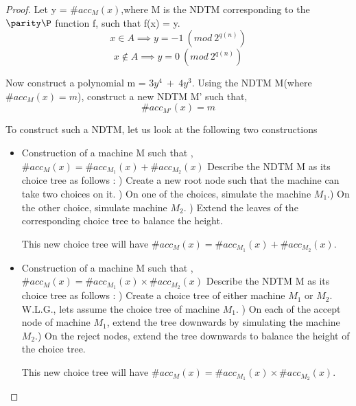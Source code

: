 \documentclass[11pt]{article}
\begin{document}
\begin{proof}
 Let y = $\#acc_{M}(x)$,where M is the NDTM corresponding to the $\parity \P$ function f, such that f(x) = y. \newline
 $$x \in A \implies y = -1~(mod~2^{q(n)})$$ 
$$x \notin A \implies y = 0~(mod~2^{q(n)})$$
 
 Now construct a polynomial m = $3y^{4}~+~4y^{3}$. Using the NDTM M(where $\#acc_{M}(x) = m$), construct a new NDTM M' such that,
 $$\#acc_{M'}(x) = m$$
 
  To construct such a NDTM, let us look at the following two constructions
  \begin{itemize}
   \item 
    Construction of a machine M such that , $\#acc_{M}(x) = \#acc_{M_{1}}(x) + \#acc_{M_{2}}(x)$ \newline
    Describe the NDTM M as its choice tree as follows : ) Create a new root node such that the machine can take two choices on it. ) On one of the choices, simulate the machine $M_{1}$.) On the other choice, simulate machine $M_{2}$. ) Extend the leaves of the corresponding choice tree to balance the height. \newline
    
    This new choice tree will have $\#acc_{M}(x) = \#acc_{M_{1}}(x) + \#acc_{M_{2}}(x)$.
    \item
    Construction of a machine M such that , $\#acc_{M}(x) = \#acc_{M_{1}}(x) \times \#acc_{M_{2}}(x)$ \newline
    Describe the NDTM M as its choice tree as follows : ) Create a choice tree of either machine $M_{1}$ or $M_{2}$. W.L.G., lets assume the choice tree of machine $M_{1}$. ) On each of the accept node of machine $M_{1}$, extend the tree downwards by simulating the machine $M_{2}$.) On the reject nodes, extend the tree downwards to balance the height of the choice tree. \newline
    
    This new choice tree will have $\#acc_{M}(x) = \#acc_{M_{1}}(x) \times \#acc_{M_{2}}(x)$.
    
  \end{itemize}
  

\end{proof}
\end{document}

